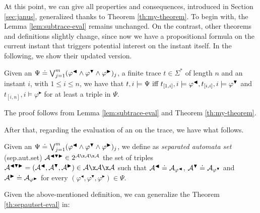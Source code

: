 At this point, we can give all properties and consequences, introduced in Section \ref{sec:janus}, generalized thanks to Theorem \ref{th:my-theorem}. To begin with, the Lemma \ref{lem:subtrace-eval} remains unchanged. On the contrast, other theorems and definitions slightly change, since now we have a propositional formula on the current instant that triggers potential interest on the instant itself. In the following, we show their updated version.

\begin{theorem}\label{th:sepformulas-eval2}
Given an \rcon\xspace $\Psi \doteq \bigvee^{m}_{j=1} (\varphi^{\blacktriangleleft} \wedge \varphi^{\blacktriangledown} \wedge \varphi^{\blacktriangleright})_j$, a finite trace $t \in \Sigma^*$ of length $n$ and an instant $i$, with $1 \le i \le n$, we have that $t,i \models \Psi \ \text{iff}\  t_{[1,i]}, i \models \varphi^\blacktriangleleft, t_{[i,i]}, i \models \varphi^{\blacktriangledown}$ and $t_{[i,n]}, i \models \varphi^\blacktriangleright$ for at least a triple in $\Psi$.
\end{theorem}
\noindent The proof follows from Lemma \ref{lem:subtrace-eval} and Theorem \ref{th:my-theorem}.

After that, regarding the evaluation of an \rcon\xspace on the trace, we have what follows.

\begin{definition}\label{def:automaton-eval2}
Given an \rcon\xspace $\Psi \doteq \bigvee^{m}_{j=1} (\varphi^{\blacktriangleleft} \wedge \varphi^{\blacktriangledown} \wedge \varphi^{\blacktriangleright})_j$, we define as \emph{separated automata set} (sep.aut.set) $\automaton^{\blacktriangleleft \blacktriangledown \blacktriangleright} \in 2^{\automaton \x \automaton \x \automaton}$ the set of triples $\automaton^{\blacktriangleleft \blacktriangledown \blacktriangleright} = (\automaton^{\blacktriangleleft}, \automaton^{\blacktriangledown}, \automaton^{\blacktriangleright}) \in \automaton \x \automaton \x \automaton$ such that $\mathcal{A}^{\blacktriangleleft} \doteq \mathcal{A}_{\varphi^\blacktriangleleft}$, $\mathcal{A}^{\blacktriangledown} \doteq \mathcal{A}_{\varphi^\blacktriangledown}$ and $\mathcal{A}^{\blacktriangleright} \doteq \mathcal{A}_{\varphi^\blacktriangleright}$ for every $(\varphi^{\blacktriangleleft},\varphi^{\blacktriangledown},\varphi^{\blacktriangleright}) \in \Psi$.
\end{definition}

\noindent Given the above-mentioned definition, we can generalize the Theorem \ref{th:sepautset-eval} in:

